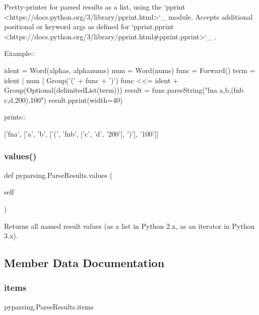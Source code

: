 \begin{DoxyVerb}Pretty-printer for parsed results as a list, using the
`pprint <https://docs.python.org/3/library/pprint.html>`_ module.
Accepts additional positional or keyword args as defined for
`pprint.pprint <https://docs.python.org/3/library/pprint.html#pprint.pprint>`_ .

Example::

    ident = Word(alphas, alphanums)
    num = Word(nums)
    func = Forward()
    term = ident | num | Group('(' + func + ')')
    func <<= ident + Group(Optional(delimitedList(term)))
    result = func.parseString("fna a,b,(fnb c,d,200),100")
    result.pprint(width=40)

prints::

    ['fna',
     ['a',
      'b',
      ['(', 'fnb', ['c', 'd', '200'], ')'],
      '100']]
\end{DoxyVerb}
 \mbox{\label{classpyparsing_1_1ParseResults_ac90247e940d431ca9c975eade0a88dce}} 
\subsubsection{\texorpdfstring{values()}{values()}}
{\footnotesize\ttfamily def pyparsing.\+Parse\+Results.\+values (\begin{DoxyParamCaption}\item[{}]{self }\end{DoxyParamCaption})}

\begin{DoxyVerb}Returns all named result values (as a list in Python 2.x, as an iterator in Python 3.x).\end{DoxyVerb}
 

\subsection{Member Data Documentation}
\mbox{\label{classpyparsing_1_1ParseResults_a7b4ae7f3bd464b8be79308599a11544d}} 
\subsubsection{\texorpdfstring{items}{items}}
{\footnotesize\ttfamily pyparsing.\+Parse\+Results.\+items\hspace{0.3cm}{\ttfamily [static]}}

